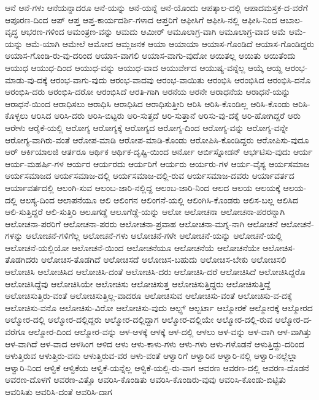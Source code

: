 {ಆನೆ
ಆನೆ-ಗಳು
ಆನೆಯನ್ನಾದರೂ
ಆನೆ-ಯನ್ನು
ಆನೆ-ಯನ್ನೆ
ಆನೆ-ಯೊಂದು
ಆಪತ್ಕಾಲ-ದಲ್ಲಿ
ಆಪಾದಮಸ್ತಕ-ದ-ವರೆಗೆ
ಆಪೂರಣ-ದಿಂದ
ಆಪ್
ಆಪ್ತ
ಆಪ್ತ-ಕಾರ್ಯದರ್ಶಿ-ಗಳಾದ
ಆಪ್ತರಿಗೆ
ಆಫೀಸಿಗೆ
ಆಫೀಸಿ-ನಲ್ಲಿ
ಆಫೀಸಿ-ನಿಂದ
ಆಬಾಲ-ವೃದ್ಧ
ಆಭರಣ-ಗಳಿಂದ
ಆಮಂತ್ರಣ-ವನ್ನು
ಆಮದು
ಆಮೀರ್
ಆಮೂಲಾಗ್ರ-ವಾಗಿ
ಆಮೂಲಾಗ್ರ-ವಾದ
ಆಮೆ
ಆಮೆ-ಯನ್ನು
ಆಮೆ-ಯಾಗಿ
ಆಮೇಲೆ
ಆಮೋದ
ಆಮ್ಲಜನಕ
ಆಯಾ
ಆಯಾಯಾ
ಆಯಾಸ-ಗೊಂಡಿದೆ
ಆಯಾಸ-ಗೊಂಡಿದ್ದರು
ಆಯಾಸ-ಗೊಂಡಿ-ರು-ವು-ದರಿಂದ
ಆಯಾಸ-ವಾಗಲಿ
ಆಯಾಸ-ವಾಗು-ವುದೋ
ಆಯಿತಲ್ಲ
ಆಯಿತು
ಆಯಿತೆಂದು
ಆಯುಧ
ಆಯುಧ-ದಿಂದ
ಆಯುಧ-ವನ್ನು
ಆಯುಧ-ವಾದ
ಆಯುರ್ವೇದ
ಆಯುಷ್ಯ-ವನ್ನೆಲ್ಲ
ಆಯ್ಕೆ
ಆಯ್ದ
ಆರಂಭ-ಮಾಡು-ವು-ದಕ್ಕೆ
ಆರಂಭ-ವಾಗು-ವುದು
ಆರಂಭ-ವಾದವು
ಆರಂಭ-ವಾಯಿತು
ಆರಂಭಿಸಿ
ಆರಂಭಿಸಿದ
ಆರಂಭಿಸಿ-ದನೊ
ಆರಂಭಿಸಿ-ದರು
ಆರಂಭಿಸಿ-ದರೋ
ಆರಂಭಿಸಿದೆ
ಆರತಿ-ಗಾಗಿ
ಆರನೆಯ
ಆರನೇ
ಆರಾಧನೆಯ
ಆರಾಧನೆ-ಯನ್ನು
ಆರಾಧನೆ-ಯಿಂದ
ಆರಾಧಿಸಲು
ಆರಾಧಿಸಿ
ಆರಾಧಿಸಿದ
ಆರಾಧಿಸುತ್ತೀರಿ
ಆರಿಸಿ
ಆರಿಸಿ-ಕೊಂಡಿಲ್ಲ
ಆರಿಸಿ-ಕೊಂಡು
ಆರಿಸಿ-ಕೊಳ್ಳಲು
ಆರಿಸಿದ
ಆರಿಸಿ-ದರು
ಆರಿಸಿ-ಬಿಟ್ಟರು
ಆರಿ-ಸುತ್ತದೆ
ಆರಿ-ಸುತ್ತಾನೆ
ಆರಿಸು-ವು-ದಕ್ಕೆ
ಆರಿ-ಹೋಗಿದ್ದರೆ
ಆರು
ಆರೇಳು
ಆರೈಕೆ-ಯಲ್ಲಿ
ಆರೋಗ್ಯ
ಆರೋಗ್ಯಕ್ಕೆ
ಆರೋಗ್ಯದ
ಆರೋಗ್ಯ-ದಿಂದ
ಆರೋಗ್ಯ-ವನ್ನು
ಆರೋಗ್ಯ-ವನ್ನೇ
ಆರೋಗ್ಯ-ವಾಗಿರು-ವಂತೆ
ಆರೋಪ-ಮಾಡಿ
ಆರೋಪ-ಮಾಡಿ-ಕೊಂಡು
ಆರೋಪಿಸಿ-ಕೊಂಡಿದ್ದರು
ಆರೋಪಿಸು-ವುದೂ
ಆರ್
ಆರ್ಕಿಯಾಲಜಿ
ಆರ್ತರೂ
ಆರ್ಥಿಕ
ಆರ್ಥಿಕ-ದೃಷ್ಟಿ-ಯಿಂದ
ಆರ್ನೋ
ಆರ್ಬಿಸ್ನೋಡನ್
ಆರ್ಭಟಿಸು-ವುದು
ಆರ್ಯ
ಆರ್ಯ-ಮಹರ್ಷಿ-ಗಳ
ಆರ್ಯರ
ಆರ್ಯರದು
ಆರ್ಯರಿಗೆ
ಆರ್ಯರು
ಆರ್ಯರು-ಗಳ
ಆರ್ಯ-ವೈಶ್ಯ
ಆರ್ಯಸಮಾಜ
ಆರ್ಯಸಮಾಜದ
ಆರ್ಯಸಮಾಜ-ದಲ್ಲಿ
ಆರ್ಯಸಮಾಜ-ದಲ್ಲಿ-ರುವ
ಆರ್ಯಸಮಾಜ-ದವರು
ಆರ್ಯಾವರ್ತದ
ಆರ್ಯಾವರ್ತದಲ್ಲಿ
ಆಲಂಗಿ-ಸುವ
ಆಲಂಬ-ಜಾರಿ-ನಲ್ಲಿದ್ದ
ಆಲಂಬ-ಜಾರಿ-ನಿಂದ
ಆಲದ
ಆಲಯ
ಆಲಯಕ್ಕೆ
ಆಲಯ-ದಲ್ಲಿ
ಆಲಸ್ಯ-ದಿಂದ
ಆಲಾಪನೆಯೂ
ಆಲಿ
ಆಲಿಂಗನ
ಆಲಿಂಗನೆ-ಯಲ್ಲಿ
ಆಲಿಂಗಿಸಿ-ಕೊಂಡರು
ಆಲಿಸ-ಬಲ್ಲ
ಆಲಿಸಿದ
ಆಲಿ-ಸುತ್ತಿದ್ದರೆ
ಆಲಿ-ಸುತ್ತಿರಿ
ಆಲೂಗಡ್ಡೆ
ಆಲೂಗೆಡ್ಡೆ-ಯನ್ನು
ಆಲೋ
ಆಲೋಚನಾ
ಆಲೋಚನಾ-ಪರರನ್ನಾಗಿ
ಆಲೋಚನಾ-ಪರರಿಗೆ
ಆಲೋಚನಾ-ಪರರು
ಆಲೋಚನಾ-ಪ್ರವಾಹ
ಆಲೋಚನಾ-ಮಗ್ನ-ನಾಗಿ
ಆಲೋಚನೆ
ಆಲೋಚನೆ-ಗಳನ್ನು
ಆಲೋಚನೆ-ಗಳಿಗೆಲ್ಲ
ಆಲೋಚನೆ-ಗಳು
ಆಲೋಚನೆ-ಗಳೇ
ಆಲೋಚನೆ-ಯನ್ನು
ಆಲೋಚನೆ-ಯಲ್ಲಿ
ಆಲೋಚನೆ-ಯಲ್ಲಿಯೋ
ಆಲೋಚನೆ-ಯಿಂದ
ಆಲೋಚನೆಯೂ
ಆಲೋಚನೆಯೆ
ಆಲೋಚನೆಯೇ
ಆಲೋಚಿಸ-ತೊಡಗಿದರು
ಆಲೋಚಿಸ-ತೊಡಗಿದೆ
ಆಲೋಚಿಸದೆ
ಆಲೋಚಿಸ-ಬಹುದು
ಆಲೋಚಿಸ-ಬೇಕು
ಆಲೋಚಿಸಲಿ
ಆಲೋಚಿಸಿ
ಆಲೋಚಿಸಿದ
ಆಲೋಚಿಸಿ-ದಂತೆ
ಆಲೋಚಿಸಿ-ದರು
ಆಲೋಚಿಸಿ-ದರೆ
ಆಲೋಚಿಸಿದೆ
ಆಲೋಚಿಸಿದ್ದರೊ
ಆಲೋಚಿಸಿದ್ದೆವು
ಆಲೋಚಿಸಿಯೇ
ಆಲೋಚಿಸು
ಆಲೋಚಿಸುತ್ತ
ಆಲೋಚಿಸುತ್ತಿದ್ದರು
ಆಲೋಚಿಸುತ್ತಿದ್ದೆ
ಆಲೋಚಿಸುತ್ತಿರು-ವಂತೆ
ಆಲೋಚಿಸುತ್ತಿಲ್ಲ-ವಾದರೂ
ಆಲೋಚಿಸುವ
ಆಲೋಚಿಸು-ವಂತೆ
ಆಲೋಚಿಸು-ವ-ದಕ್ಕೆ
ಆಲೋಚಿಸು-ವನೊ
ಆಲೋಚಿಸು-ವಿರೋ
ಆಲೋಚಿಸು-ವುದು
ಆಲ್ಫ್ಸ್
ಆಲ್ಬರ್ಟಾ
ಆಲ್ಮೋರಕೆ
ಆಲ್ಮೋರಕ್ಕೆ
ಆಲ್ಮೋರದ
ಆಲ್ಮೋರ-ದಲ್ಲಿ
ಆಲ್ಮೋರ-ದಲ್ಲಿದ್ದರು
ಆಲ್ಮೋರ-ದಲ್ಲಿದ್ದಾಗ
ಆಲ್ಮೋರ-ದಲ್ಲಿಯೇ
ಆಲ್ಮೋರ-ದಲ್ಲಿ-ರುವ
ಆಲ್ಮೋರ-ದ-ವರೆಗೂ
ಆಲ್ಮೋರ-ದಿಂದ
ಆಲ್ಮೋರ-ವನ್ನು
ಆಳ-ಆಳಕ್ಕೆ
ಆಳಕ್ಕೆ
ಆಳ-ದಲ್ಲಿ
ಆಳಲು
ಆಳ-ವನ್ನು
ಆಳ-ವಾಗಿ
ಆಳ-ವಾಗಿತ್ತು
ಆಳ-ವಾಗಿದೆ
ಆಳ-ವಾದ
ಆಳಸಿಂಗ
ಆಳಿದ
ಆಳು
ಆಳು-ಕಾಳು-ಗಳು
ಆಳು-ಗಳು
ಆಳು-ಗಳೊಡನೆ
ಆಳುತ್ತಿದ್ದು-ದರಿಂದ
ಆಳುತ್ತಿರುವ
ಆಳುತ್ತಿರು-ವನು
ಆಳುತ್ತಿರುವ-ವರ
ಆಳು-ವಂತೆ
ಆಳ್ವಾರಿಗೆ
ಆಳ್ವಾರಿನ
ಆಳ್ವಾರಿ-ನಲ್ಲಿ
ಆಳ್ವಾರಿ-ನಲ್ಲೆಲ್ಲಾ
ಆಳ್ವಾರಿ-ನಿಂದ
ಆಳ್ವಿಕೆ
ಆಳ್ವಿಕೆಯ
ಆಳ್ವಿಕೆ-ಯನ್ನೆಲ್ಲ
ಆಳ್ವಿಕೆ-ಯಲ್ಲಿ-ರು-ವಾಗ
ಆವರಣ
ಆವರಣ-ದಲ್ಲಿ
ಆವರಣ-ದೊಡನೆ
ಆವರಣ-ದೊಳಗೆ
ಆವರಣ-ವಿತ್ತೊ
ಆವರಿಸಿ-ಕೊಂಡಿತು
ಆವರಿಸಿ-ಕೊಂಡಿರು-ವುವು
ಆವರಿಸಿ-ಕೊಂಡು-ಬಿಟ್ಟಿತು
ಆವರಿಸಿತು
ಆವರಿಸಿ-ದಂತೆ
ಆವರಿಸಿ-ದಾಗ
}

